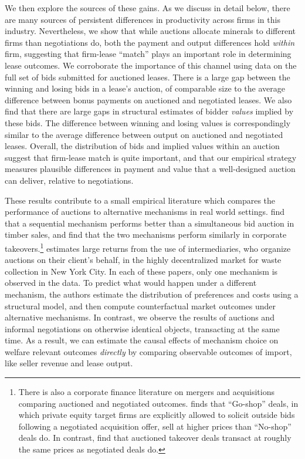 We then explore the sources of these gains. As we discuss in detail below, there are many sources of persistent differences in productivity across firms in this industry. Nevertheless, we show that while auctions allocate minerals to different firms than negotiations do, both the payment and output differences hold \textit{within} firm, suggesting that firm-lease ``match'' plays an important role in determining lease outcomes. We corroborate the importance of this channel using data on the full set of bids submitted for auctioned leases. There is a large gap between the winning and losing bids in a lease's auction, of comparable size to the average difference between bonus payments on auctioned and negotiated leases.  We also find that there are large gaps in structural estimates of bidder \textit{values} implied by these bids.  The difference between winning and losing values is correspondingly similar to the average difference between output on auctioned and negotiated leases.  Overall, the distribution of bids and implied values within an auction suggest that firm-lease match is quite important, and that our empirical strategy measures plausible differences in payment and value that a well-designed auction can deliver, relative to negotiations.  

These results contribute to a small empirical literature which compares the performance of auctions to alternative mechanisms in real world settings. \cite{roberts_when_2013} find that a sequential mechanism performs better than a simultaneous bid auction in timber sales, and \cite{gentry2018entry} find that the two mechanisms perform similarly in corporate takeovers.\footnote{There is also a corporate finance literature on mergers and acquisitions comparing auctioned and negotiated outcomes. \cite{subramanian_go-shops_2007} finds that ``Go-shop'' deals, in which private equity target firms are explicitly allowed to solicit outside bids following a negotiated acquisition offer, sell at higher prices than ``No-shop'' deals do. In contrast, \cite{boone_how_2007} find that auctioned takeover deals transact at roughly the same prices as negotiated deals do.} \cite{salz_intermediation_2017} estimates large returns from the use of intermediaries, who organize auctions on their client's behalf, in the highly decentralized market for waste collection in New York City. In each of these papers, only one mechanism is observed in the data.  To predict what would happen under a different mechanism, the authors estimate the distribution of preferences and costs using a structural model, and then compute counterfactual market outcomes under alternative mechanisms.  In contrast, we observe the results of auctions and informal negotiations on otherwise identical objects, transacting at the same time.  As a result, we can estimate the causal effects of mechanism choice on welfare relevant outcomes \emph{directly} by comparing observable outcomes of import, like seller revenue and lease output. 

